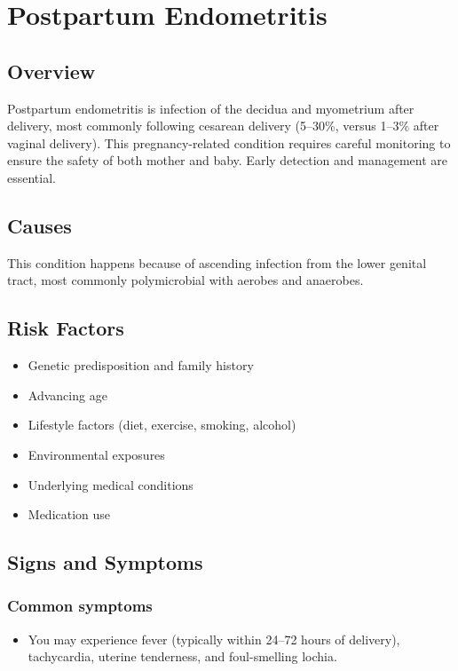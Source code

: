 \chapter{Postpartum Endometritis}
\label{sec:Postpartum Endometritis}

\section{Overview}
Postpartum endometritis is infection of the decidua and myometrium after delivery, most commonly following cesarean delivery (5--30\%, versus 1--3\% after vaginal delivery). This pregnancy-related condition requires careful monitoring to ensure the safety of both mother and baby. Early detection and management are essential.
\section{Causes}
This condition happens because of ascending infection from the lower genital tract, most commonly polymicrobial with aerobes and anaerobes.     
\section{Risk Factors}

\begin{itemize}[noitemsep]
  \item Genetic predisposition and family history
  \item Advancing age
  \item Lifestyle factors (diet, exercise, smoking, alcohol)
  \item Environmental exposures
  \item Underlying medical conditions
  \item Medication use
\end{itemize}
\section{Signs and Symptoms}

\subsection{Common symptoms}
\begin{itemize}[noitemsep]
  \item You may experience fever (typically within 24--72 hours of delivery), tachycardia, uterine tenderness, and foul-smelling lochia. 
  \end{itemize}

